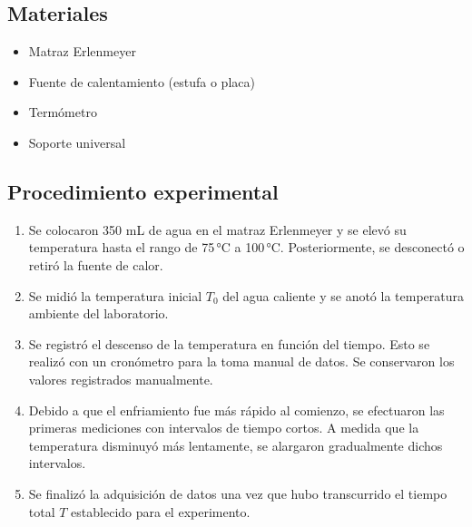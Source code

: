 \subsection*{Materiales}
\begin{itemize}
    \item Matraz Erlenmeyer
        \item Fuente de calentamiento (estufa o placa)
	    \item Termómetro
	        \item Soporte universal
		\end{itemize}
		\subsection*{Procedimiento experimental}
		\begin{enumerate}
		    \item Se colocaron 350 mL de agua en el matraz Erlenmeyer y se elevó su temperatura hasta el rango de 75\,°C a 100\,°C. Posteriormente, se desconectó o retiró la fuente de calor.
		        \item Se midió la temperatura inicial \(T_0\) del agua caliente y se anotó la temperatura ambiente del laboratorio.
			    \item Se registró el descenso de la temperatura en función del tiempo. Esto se realizó con un cronómetro para la toma manual de datos. Se conservaron los valores registrados manualmente.
			        \item Debido a que el enfriamiento fue más rápido al comienzo, se efectuaron las primeras mediciones con intervalos de tiempo cortos. A medida que la temperatura disminuyó más lentamente, se alargaron gradualmente dichos intervalos.
				    \item Se finalizó la adquisición de datos una vez que hubo transcurrido el tiempo total \(T\) establecido para el experimento.
				    \end{enumerate}
